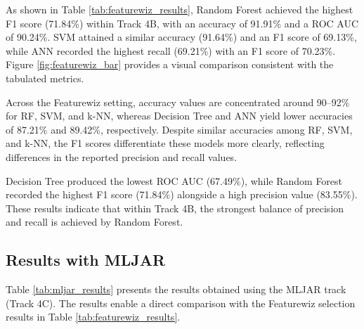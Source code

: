 As shown in Table \ref{tab:featurewiz_results}, Random Forest achieved the highest F1 score (71.84\%) within Track 4B, with an accuracy of 91.91\% and a ROC AUC of 90.24\%. SVM attained a similar accuracy (91.64\%) and an F1 score of 69.13\%, while ANN recorded the highest recall (69.21\%) with an F1 score of 70.23\%. Figure \ref{fig:featurewiz_bar} provides a visual comparison consistent with the tabulated metrics.

Across the Featurewiz setting, accuracy values are concentrated around 90--92\% for RF, SVM, and k-NN, whereas Decision Tree and ANN yield lower accuracies of 87.21\% and 89.42\%, respectively. Despite similar accuracies among RF, SVM, and k-NN, the F1 scores differentiate these models more clearly, reflecting differences in the reported precision and recall values.

Decision Tree produced the lowest ROC AUC (67.49\%), while Random Forest recorded the highest F1 score (71.84\%) alongside a high precision value (83.55\%). These results indicate that within Track 4B, the strongest balance of precision and recall is achieved by Random Forest.

\subsection{Results with MLJAR}

Table \ref{tab:mljar_results} presents the results obtained using the MLJAR track (Track 4C). The results enable a direct comparison with the Featurewiz selection results in Table \ref{tab:featurewiz_results}.

